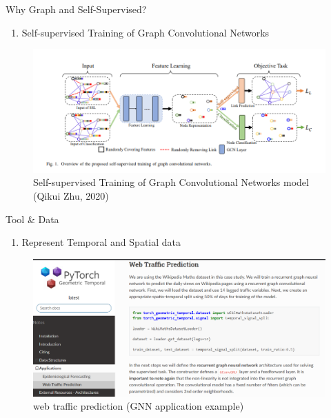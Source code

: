 \documentclass{beamer}
\newcounter{saveenumi}
\newcommand{\seti}{\setcounter{saveenumi}{\value{enumi}}}
\newcommand{\conti}{\setcounter{enumi}{\value{saveenumi}}}
\begin{document}
	\begin{frame}[t]{Why Graph and Self-Supervised?}
		\begin{enumerate}
			\conti
			\item Self-supervised Training of Graph Convolutional Networks
			
		\end{enumerate}
		\begin{figure}
			\includegraphics[scale=0.4]{self_graph.png}
			\caption{Self-supervised Training of Graph Convolutional Networks model (Qikui Zhu, 2020)}
		\end{figure}
	\end{frame}

	\begin{frame}[t]{Tool \& Data}
		\begin{enumerate}
			\item Represent Temporal and Spatial data
			\seti
		\end{enumerate}
	\begin{figure}
		\includegraphics[scale=0.3]{web.png}
		\caption{web traffic prediction (GNN application example)}
	\end{figure}
	\end{frame}
	
\end{document}
